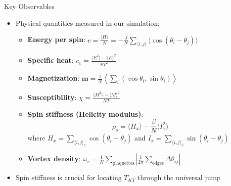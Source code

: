 \documentclass[11pt,aspectratio=169]{beamer}
\begin{document}
\begin{frame}{Key Observables}
    \begin{itemize}
        \item Physical quantities measured in our simulation:
        \begin{itemize}
            \item \textbf{Energy per spin}: $e = \frac{\langle H \rangle}{N} = -\frac{J}{N} \sum_{\langle i,j \rangle} \langle\cos(\theta_i - \theta_j)\rangle$
            \item \textbf{Specific heat}: $c_v = \frac{\langle E^2 \rangle - \langle E \rangle^2}{NT^2}$
            \item \textbf{Magnetization}: $\mathbf{m} = \frac{1}{N}\left\langle \sum_i (\cos\theta_i, \sin\theta_i) \right\rangle$
            \item \textbf{Susceptibility}: $\chi = \frac{\langle M^2 \rangle - \langle M \rangle^2}{NT}$
            \pause
            \item \textbf{Spin stiffness (Helicity modulus)}:
            \begin{equation}
                \rho_s = \langle H_x \rangle - \frac{\beta}{N} \langle I_x^2 \rangle
            \end{equation}
            where $H_x = \sum_{\langle i,j \rangle_x} \cos(\theta_i - \theta_j)$ and $I_x = \sum_{\langle i,j \rangle_x} \sin(\theta_i - \theta_j)$
            \pause
            \item \textbf{Vortex density}: $\omega_v = \frac{1}{N} \sum_{\text{plaquettes}} \left| \frac{1}{2\pi} \sum_{\text{edges}} \Delta\theta_{ij} \right|$
        \end{itemize}
        \item Spin stiffness is crucial for locating $T_{KT}$ through the universal jump
    \end{itemize}
\end{frame}
\end{document}
